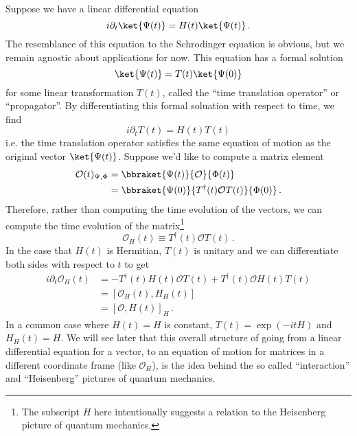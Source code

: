 Suppose we have a linear differential equation
\begin{equation}
  i \partial_t \ket{\Psi(t)} = H(t) \ket{\Psi(t)} \, .
\end{equation}
The resemblance of this equation to the Schrodinger equation is obvious, but we remain agnostic about applications for now.
This equation has a formal solution
\begin{equation}
  \ket{\Psi(t)} = T(t) \ket{\Psi(0)}
\end{equation}
for some linear transformation $T(t)$, called the ``time translation operator'' or ``propagator''.
By differentiating this formal soluation with respect to time, we find
\begin{equation}
  i \partial_t T(t) = H(t) T(t)
\end{equation}
i.e. the time translation operator satisfies the same equation of motion as the original vector $\ket{\Psi(t)}$.
Suppose we'd like to compute a matrix element
\begin{align}
  \mathcal{O}(t)_{\Psi,\Phi}
  &= \bbraket{\Psi(t)}{\mathcal{O}}{\Phi(t)} \nonumber \\
  &= \bbraket{\Psi(0)}{T^\dagger(t) \mathcal{O}T(t)}{\Phi(0)}
  \, .
\end{align}
Therefore, rather than computing the time evolution of the vectors, we can compute the time evolution of the matrix\footnote{The subscript $H$ here intentionally suggests a relation to the Heisenberg picture of quantum mechanics.}
\begin{equation}
  \mathcal{O}_H(t) \equiv T^\dagger(t) \mathcal{O} T(t)
  \, .
\end{equation}
In the case that $H(t)$ is Hermitian, $T(t)$ is unitary and we can differentiate both sides with respect to $t$ to get
\begin{align}
  i \partial_t \mathcal{O}_H(t)
  &= -T^\dagger(t) H(t) \mathcal{O} T(t)
     + T^\dagger(t) \mathcal{O} H(t) T(t) \nonumber \\
  &= \left[ \mathcal{O}_H(t), H_H(t) \right] \\
  &= \left[ \mathcal{O}, H(t) \right]_H
  \, .
\end{align}
In a common case where $H(t) = H$ is constant, $T(t) = \exp(-i t H)$ and $H_H(t) = H$.
We will see later that this overall structure of going from a linear differential equation for a vector, to an equation of motion for matrices in a different coordinate frame (like $\mathcal{O}_H$), is the idea behind the so called ``interaction'' and ``Heisenberg'' pictures of quantum mechanics.


